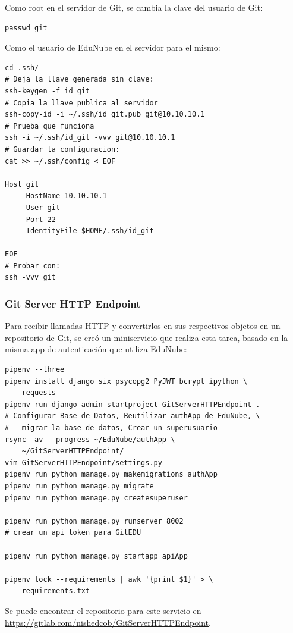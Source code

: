 Como root en el servidor de Git, se cambia la clave del usuario de Git:
\begin{lstlisting}
passwd git
\end{lstlisting}

Como el usuario de EduNube en el servidor para el mismo:
\begin{lstlisting}
cd .ssh/
# Deja la llave generada sin clave:
ssh-keygen -f id_git
# Copia la llave publica al servidor
ssh-copy-id -i ~/.ssh/id_git.pub git@10.10.10.1
# Prueba que funciona
ssh -i ~/.ssh/id_git -vvv git@10.10.10.1
# Guardar la configuracion:
cat >> ~/.ssh/config < EOF

Host git
     HostName 10.10.10.1
     User git
     Port 22
     IdentityFile $HOME/.ssh/id_git

EOF
# Probar con:
ssh -vvv git
\end{lstlisting}

 
\subsubsection{Git Server HTTP Endpoint}
Para recibir llamadas HTTP y convertirlos en sus respectivos objetos en un repositorio de Git, se creó un miniservicio que realiza esta tarea, basado en la misma app de autenticación que utiliza EduNube:
\begin{lstlisting}
pipenv --three
pipenv install django six psycopg2 PyJWT bcrypt ipython \
	requests
pipenv run django-admin startproject GitServerHTTPEndpoint .
# Configurar Base de Datos, Reutilizar authApp de EduNube, \
#	migrar la base de datos, Crear un superusuario
rsync -av --progress ~/EduNube/authApp \
	~/GitServerHTTPEndpoint/
vim GitServerHTTPEndpoint/settings.py
pipenv run python manage.py makemigrations authApp
pipenv run python manage.py migrate
pipenv run python manage.py createsuperuser

pipenv run python manage.py runserver 8002
# crear un api token para GitEDU

pipenv run python manage.py startapp apiApp

pipenv lock --requirements | awk '{print $1}' > \
	requirements.txt
\end{lstlisting}

Se puede encontrar el repositorio para este servicio en \url{https://gitlab.com/nishedcob/GitServerHTTPEndpoint}.

